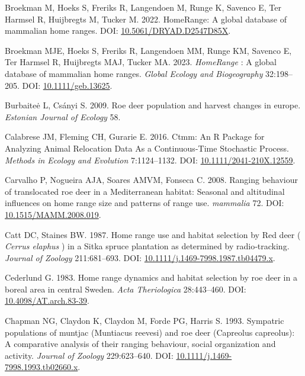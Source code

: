 \documentclass[10pt,a4paper]{article}
\newlength{\cslhangindent}
\newenvironment{CSLReferences}[2] %
 {\begin{list}{}{%
  \setlength{\itemindent}{0pt}
  \setlength{\leftmargin}{0pt}
  \setlength{\parsep}{0pt}
  \ifodd #1
   \setlength{\leftmargin}{\cslhangindent}
   \setlength{\itemindent}{-1\cslhangindent}
  \fi
  \setlength{\itemsep}{#2\baselineskip}}}
 {\end{list}}
\begin{document}
\begin{CSLReferences}{1}{0}
Broekman M, Hoeks S, Freriks R, Langendoen M, Runge K, Savenco E, Ter Harmsel R, Huijbregts M, Tucker M. 2022. {HomeRange}: {A} global database of mammalian home ranges. DOI: \href{https://doi.org/10.5061/DRYAD.D2547D85X}{10.5061/DRYAD.D2547D85X}.

Broekman MJE, Hoeks S, Freriks R, Langendoen MM, Runge KM, Savenco E, Ter Harmsel R, Huijbregts MAJ, Tucker MA. 2023. \emph{HomeRange} : {A} global database of mammalian home ranges. \emph{Global Ecology and Biogeography} 32:198--205. DOI: \href{https://doi.org/10.1111/geb.13625}{10.1111/geb.13625}.

Burbaiteė L, Csányi S. 2009. Roe deer population and harvest changes in europe. \emph{Estonian Journal of Ecology} 58.

Calabrese JM, Fleming CH, Gurarie E. 2016. Ctmm: An {R} {Package} for {Analyzing} {Animal} {Relocation} {Data} {As} a {Continuous}-{Time} {Stochastic} {Process}. \emph{Methods in Ecology and Evolution} 7:1124--1132. DOI: \href{https://doi.org/10.1111/2041-210X.12559}{10.1111/2041-210X.12559}.

Carvalho P, Nogueira AJA, Soares AMVM, Fonseca C. 2008. Ranging behaviour of translocated roe deer in a {Mediterranean} habitat: Seasonal and altitudinal influences on home range size and patterns of range use. \emph{mammalia} 72. DOI: \href{https://doi.org/10.1515/MAMM.2008.019}{10.1515/MAMM.2008.019}.

Catt DC, Staines BW. 1987. Home range use and habitat selection by {Red} deer ( \emph{{Cerrus} elaphus} ) in a {Sitka} spruce plantation as determined by radio‐tracking. \emph{Journal of Zoology} 211:681--693. DOI: \href{https://doi.org/10.1111/j.1469-7998.1987.tb04479.x}{10.1111/j.1469-7998.1987.tb04479.x}.

Cederlund G. 1983. Home range dynamics and habitat selection by roe deer in a boreal area in central {Sweden}. \emph{Acta Theriologica} 28:443--460. DOI: \href{https://doi.org/10.4098/AT.arch.83-39}{10.4098/AT.arch.83-39}.

Chapman NG, Claydon K, Claydon M, Forde PG, Harris S. 1993. Sympatric populations of muntjac ({Muntiacus} reevesi) and roe deer ({Capreolus} capreolus): A comparative analysis of their ranging behaviour, social organization and activity. \emph{Journal of Zoology} 229:623--640. DOI: \href{https://doi.org/10.1111/j.1469-7998.1993.tb02660.x}{10.1111/j.1469-7998.1993.tb02660.x}.


\end{CSLReferences}
\end{document}
